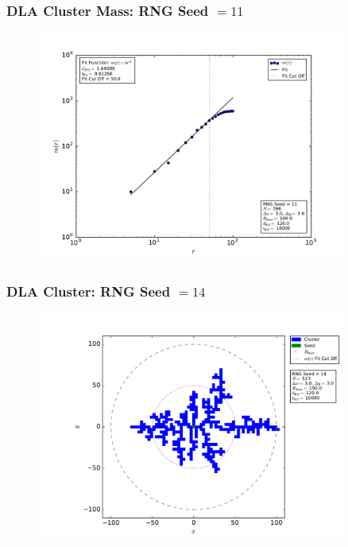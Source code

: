 \documentclass[mathserif,18pt,xcolor=table]{beamer}
\begin{document}
\begin{frame}
  \frametitle{DLA Cluster Mass: RNG Seed $= 11$}
\begin{figure}
  \centering
  \includegraphics[width=0.9\textwidth]{problem_3/large_cluster_mass_seed_num_11.pdf}
\end{figure}
\end{frame}

\begin{frame}
  \frametitle{DLA Cluster: RNG Seed $= 14$}
\begin{figure}
  \centering
  \includegraphics[width=0.9\textwidth]{problem_3/large_cluster_seed_num_14.pdf}
\end{figure}
\end{frame}
\end{document}
